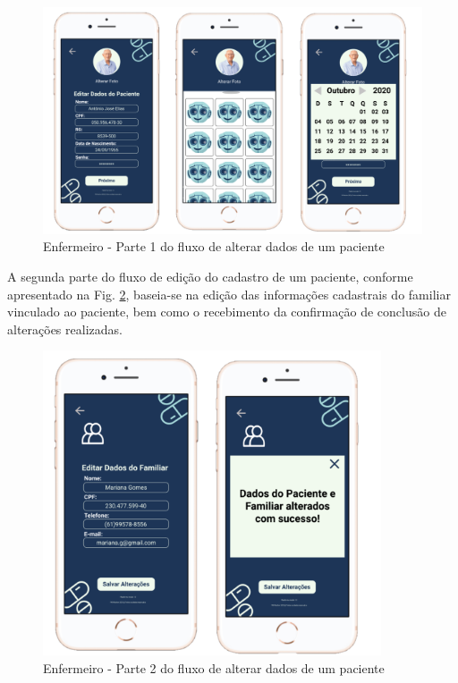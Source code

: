 \begin{figure}[H]
    \centering
    \includegraphics[width=15cm]{figuras/software/Atual_prototipo/Enfermeiro_editarDadosPaciente_1.png}
    \caption{Enfermeiro - Parte 1 do fluxo de alterar dados de um paciente}
     \label{fig:prototipo_enfermeiro_alterarDadosPaciente_1}
    
\end{figure}

A segunda parte do fluxo de edição do cadastro de um paciente, conforme apresentado na Fig. \ref{fig:prototipo_enfermeiro_alterarDadosPaciente_2}, baseia-se na edição das informações cadastrais do familiar vinculado ao paciente, bem como o recebimento da confirmação de conclusão de alterações realizadas.

\begin{figure}[H]
    \centering
    \includegraphics[width=10cm]{figuras/software/Atual_prototipo/Enfermeiro_editarDadosPaciente_2.png}
    \caption{Enfermeiro - Parte 2 do fluxo de alterar dados de um paciente}
    \label{fig:prototipo_enfermeiro_alterarDadosPaciente_2}
\end{figure}

